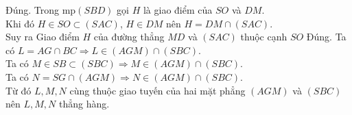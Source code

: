 \begin{ex}
{\begin{itemchoice}
			\itemch Đúng. Trong mp$ (SBD) $ gọi $H$ là giao điểm của $ SO $ và $ DM $. \\
			Khi đó $ H \in SO \subset (SAC)$, $H \in DM $ nên $ H = DM \cap (SAC) $.\\
			Suy ra Giao điểm $ H $ của đường thẳng $ MD $ và $ (SAC) $ thuộc cạnh $SO$
			\itemch Đúng. Ta có $ L = AG \cap BC \Rightarrow L \in (AGM) \cap (SBC)$. \\
			Ta có $ M \in SB \subset (SBC) \Rightarrow M \in (AGM) \cap (SBC)$. \\
			Ta có $ N = SG \cap (AGM) \Rightarrow N \in (AGM) \cap (SBC)$. \\
			Từ đó $ L, M, N $ cùng thuộc giao tuyến của hai mặt phẳng $ (AGM) $ và $ (SBC) $ nên $ L, M, N $ thẳng hàng.
		\end{itemchoice}
		}
\end{ex}

